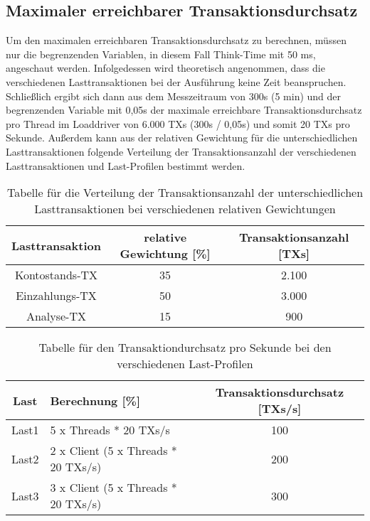 \subsection{Maximaler erreichbarer Transaktionsdurchsatz}\label{subsec:maximaler-erreichbarer-transaktionsdurchsatz}
Um den maximalen erreichbaren Transaktionsdurchsatz zu berechnen, müssen nur die begrenzenden Variablen, in diesem Fall Think-Time mit 50 ms, angeschaut werden.
Infolgedessen wird theoretisch angenommen, dass die verschiedenen Lasttransaktionen bei der Ausführung keine Zeit beanspruchen.
Schließlich ergibt sich dann aus dem Messzeitraum von 300s (5 min) und der begrenzenden Variable mit 0,05s der maximale erreichbare Transaktionsdurchsatz pro Thread im Loaddriver von 6.000 TXs (300s / 0,05s) und somit 20 TXs pro Sekunde.
Außerdem kann aus der relativen Gewichtung für die unterschiedlichen Lasttransaktionen folgende Verteilung der Transaktionsanzahl der verschiedenen Lasttransaktionen und Last-Profilen bestimmt werden.
\begin{table}[h!]
    \centering
    \begin{tabular}{|c|c|c|}
        \hline
        Lasttransaktion & relative Gewichtung [\%] & Transaktionsanzahl [TXs] \\  \hline
        Kontostands-TX & 35 & 2.100 \\ \hline
        Einzahlungs-TX & 50 & 3.000 \\ \hline
        Analyse-TX & 15 & 900 \\ \hline
    \end{tabular}
    \caption{Tabelle für die Verteilung der Transaktionsanzahl der unterschiedlichen Lasttransaktionen bei verschiedenen relativen Gewichtungen}
    \label{tab:1}
\end{table}
\begin{table}[h!]
    \centering
    \begin{tabular}{|c|l|c|}
        \hline
        Last & Berechnung [\%] & Transaktionsdurchsatz [TXs/s] \\  \hline
        Last1 & 5 x Threads * 20 TXs/s & 100 \\ \hline
        Last2 & 2 x Client (5 x Threads * 20 TXs/s) & 200 \\ \hline
        Last3 & 3 x Client (5 x Threads * 20 TXs/s) & 300 \\ \hline
    \end{tabular}
    \caption{Tabelle für den Transaktiondurchsatz pro Sekunde bei den verschiedenen Last-Profilen}
    \label{tab:2}
\end{table}

